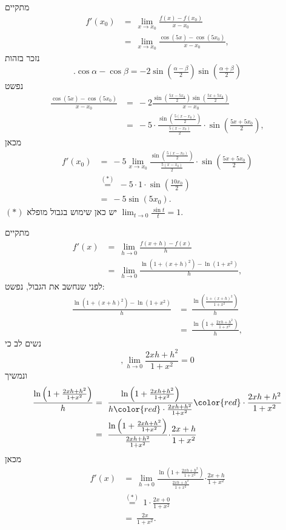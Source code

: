\begin{solbox}
\item
מתקיים
\begin{align*}
    f'(x_0)&=\ \lim_{x\to x_0}\frac{f(x)-f(x_0)}{x-x_0}\\
    &=\ \lim_{x\to x_0}\frac{\cos(5x)-\cos(5x_0)}{x-x_0},
\end{align*}
נזכר בזהות
$$.\cos\alpha-\cos\beta=-2\sin(\tfrac{\alpha-\beta}{2})\sin(\tfrac{\alpha+\beta}{2})$$
נפשט
\begin{align*}
    \frac{\cos(5x)-\cos(5x_0)}{x-x_0}&=\ -2\frac{\sin(\tfrac{5x-5x_0}{2})\sin(\tfrac{5x+5x_0}{2})}{x-x_0}\\
    &=\ -5\cdot\frac{\sin(\tfrac{5(x-x_0)}{2})}{\tfrac{5(x-x_0)}{2}}\cdot\sin(\tfrac{5x+5x_0}{2}),
\end{align*}
מכאן
\begin{align*}
    f'(x_0)&=\ -5\lim_{x\to x_0}\frac{\sin(\tfrac{5(x-x_0)}{2})}{\tfrac{5(x-x_0)}{2}}\cdot\sin(\tfrac{5x+5x_0}{2})\\
    &\overset{(\ast)}{=}\ -5\cdot1\cdot\sin(\tfrac{10x_0}{2})\\
    &=\ -5\sin(5x_0).
\end{align*}
$(\ast)$
יש כאן שימוש בגבול מופלא
$\displaystyle\lim_{t\to0}\frac{\sin t}{t}=1$.
\item
מתקיים
\begin{align*}
    f'(x)&=\ \lim_{h\to0}\frac{f(x+h)-f(x)}{h}\\
    &=\ \lim_{h\to0}\frac{\ln(1+(x+h)^2)-\ln(1+x^2)}{h},
\end{align*}
לפני שנחשב את הגבול, נפשט:
\begin{align*}
    \frac{\ln(1+(x+h)^2)-\ln(1+x^2)}{h}&=\ \frac{\ln\left(\tfrac{1+(x+h)^2}{1+x^2}\right)}{h}\\
    &=\ \frac{\ln\left(1+\tfrac{2xh+h^2}{1+x^2}\right)}{h},
\end{align*}
נשים לב כי
$$,\lim_{h\to 0}\frac{2xh+h^2}{1+x^2}=0$$
ונמשיך
\begin{align*}
    \frac{\ln\left(1+\tfrac{2xh+h^2}{1+x^2}\right)}{h}&=\ \frac{\ln\left(1+\tfrac{2xh+h^2}{1+x^2}\right)}{h{\color{red}\cdot\frac{2xh+h^2}{1+x^2}}}{\color{red}\cdot\frac{2xh+h^2}{1+x^2}}\\
    &=\ \frac{\ln\left(1+\tfrac{2xh+h^2}{1+x^2}\right)}{{\frac{2xh+h^2}{1+x^2}}}{\cdot\frac{2x+h}{1+x^2}}\\
\end{align*}
מכאן
\begin{align*}
    f'(x)&=\ \lim_{h\to0}\frac{\ln\left(1+\tfrac{2xh+h^2}{1+x^2}\right)}{{\frac{2xh+h^2}{1+x^2}}}{\cdot\frac{2x+h}{1+x^2}}\\
    &\overset{(\ast)}{=}\ 1\cdot\frac{2x+0}{1+x^2}\\
    &=\ \frac{2x}{1+x^2}.
\end{align*}


\end{solbox}

